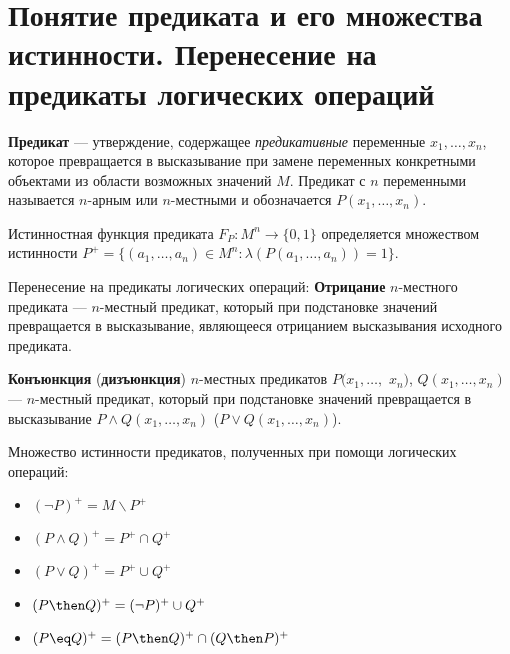 \section{Понятие предиката и его множества истинности. Перенесение на предикаты логических операций}
\dftion \textbf{Предикат} --- утверждение, содержащее \textit{предикативные} переменные $x_1,\dots,x_n$, которое превращается в высказывание при замене переменных конкретными объектами из области возможных значений $M$. Предикат с $n$ переменными называется $n$-арным или $n$-местными и обозначается $P(x_1,\dots,x_n)$.

Истинностная функция предиката $F_P : M^n \to \{0,1\}$ определяется множеством истинности $P^+ = \{(a_1, \dots, a_n) \in M^n : \lambda(P(a_1,\dots,a_n)) = 1\}$.

Перенесение на предикаты логических операций:
\dftion \textbf{Отрицание} $n$-местного предиката --- $n$-местный предикат, который при подстановке значений превращается в высказывание, являющееся отрицанием высказывания исходного предиката.

\dftion \textbf{Конъюнкция} (\textbf{дизъюнкция}) $n$-местных предикатов $P(x_1,\dots,$ $x_n)$, $Q(x_1,\dots,x_n)$ --- $n$-местный предикат, который при подстановке значений превращается в высказывание $P\land Q(x_1,\dots,x_n)$ \Big($P\lor Q(x_1,\dots,x_n)$\Big).

Множество истинности предикатов, полученных при помощи логических операций:
\begin{itemize}
    \item $(\lnot P)^+ = M \backslash P^+$
    \item $(P \land Q)^+ = P^+ \cap Q^+$
    \item $(P \lor Q)^+ = P^+ \cup Q^+$
    \item $(P \then Q)^+ = (\lnot P)^+ \cup Q^+$
    \item $(P \eq Q)^+ = (P \then Q)^+ \cap (Q \then P)^+$
\end{itemize}
